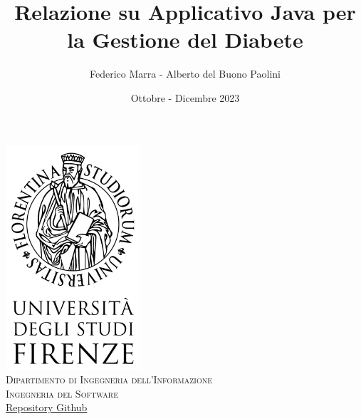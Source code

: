 \documentclass[twocolumn]{article}
\title{Relazione su Applicativo Java per la Gestione del Diabete}
\author{Federico Marra - Alberto del Buono Paolini}
\date{Ottobre - Dicembre 2023}
\begin{document}

\begin{onecolumn}
\maketitle
\thispagestyle{empty}
\vspace{2em}
\begin{center}
    \includegraphics[width=5cm]{unifi_v.png}\\[1cm]
    \textsc{\Large Dipartimento di Ingegneria dell'Informazione}\\[0.25cm]
    \textsc{\Large Ingegneria del Software}\\
    \vspace{2.5em}
    \href{https://github.com/federicomarra/swe-diab}{
        \hspace{.3em}
        \Large{Repository Github}
    }
\end{center}
\end{onecolumn}


\begin{onecolumn}
\tableofcontents    %
\thispagestyle{empty}
\vspace{1cm}
\setcounter{page}{1}
\end{onecolumn}
\newpage

\end{document}
